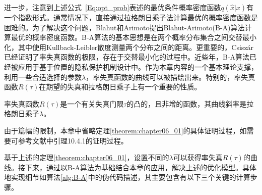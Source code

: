 进一步，注意到上述公式~\ref{Eq:opt_prob}表述的最优条件概率密度函数$q(\hat{x}|x)$有一个指数形式。通常情况下，直接通过拉格朗日乘子法计算最优的概率密度函数是困难的。为了解决这个问题，Blahut\cite{blahut1972computation}和Arimoto\cite{arimoto1972an}提出Blahut-Arimoto(B-A)算法计算最优的概率密度函数。B-A算法的基本思想是在两个概率分布集合之间交替最小化，其中使用Kullback-Leibler散度测量两个分布之间的距离。更重要的，Csisz\'{a}r\cite{csiszar1974on,csiszar1984information}已经证明了率失真函数的极限，存在于交替最小化的过程中。近些年，B-A算法已经被应用于基于位置的隐私保护机制设计中\cite{oya2017back,zhang2019online}。作为本章内容的一个基本理论支撑，利用一些合适选择的参数$\lambda$，率失真函数的曲线可以被描绘出来。特别的，率失真函数$R(\tau)$在期望的失真和拉格朗日乘子上有一个重要的性质。

\begin{theorem}\label{theorem:chapter06_01}
	率失真函数$R(\tau)$是一个有关失真门限$\tau$的凸的，且非增的函数，其曲线斜率是拉格朗日乘子$\lambda$。
\end{theorem}

由于篇幅的限制，本章中省略定理\ref{theorem:chapter06_01}的具体证明过程，如需要可参考文献中引理10.4.1的证明过程。

基于上述的定理\ref{theorem:chapter06_01}，设置不同的$\lambda$可以获得率失真$R(\tau)$的曲线。接下来，通过以B-A算法为基础结合本章的应用，解决上述的优化模型。具体地实现细节如算法\ref{alg:B-A}中的伪代码描述，其主要包含有以下三个关键的计算步骤。

